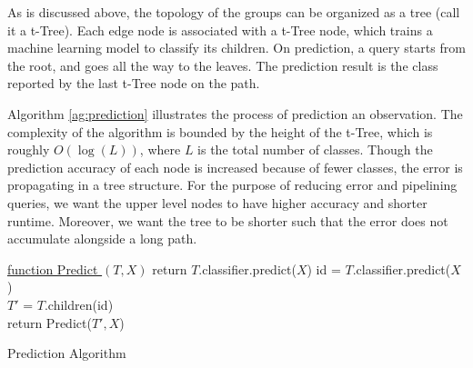 \documentclass{article}
\begin{document}
As is discussed above, the topology of the groups can be organized as a tree (call it a t-Tree). Each edge node is associated with a t-Tree node, which trains a machine learning model to classify its children. On prediction, a query starts from the root, and goes all the way to the leaves. The prediction result is the class reported by the last t-Tree node on the path. 

Algorithm \ref{ag:prediction} illustrates the process of prediction an observation. The complexity of the algorithm is bounded by the height of the t-Tree, which is roughly $O(\log(L))$, where $L$ is the total number of classes. Though the prediction accuracy of each node is increased because of fewer classes, the error is propagating in a tree structure. For the purpose of reducing error and pipelining queries, we want the upper level nodes to have higher accuracy and shorter runtime. Moreover, we want the tree to be shorter such that the error does not accumulate alongside a long path.

\begin{algorithm}[H] \label{ag:prediction}

    \underline{function Predict $(T, X)$}\;
      {
        return $T$.classifier.predict($X$)
      }
      {
        id = $T$.classifier.predict($X$)\\
        $T'$ = $T$.children(id)\\
        return Predict($T',X$)
      }
    \caption{Prediction Algorithm}
\end{algorithm}
\end{document}
